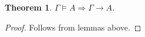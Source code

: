 \documentclass[a4paper]{article}
\theoremstyle{defin}
\newtheorem{defin}{Definition}
\theoremstyle{theorem}
\newtheorem{theorem}{Theorem}
\theoremstyle{prop}
\theoremstyle{lemma}
\theoremstyle{ex}
\theoremstyle{col}
\begin{document}
\begin{theorem}
  $\Gamma \models A \Rightarrow \Gamma \rightarrow A$.
\end{theorem}

\begin{proof}
  Follows from lemmas above.
\end{proof}

\begin{comment}

\begin{defin} Monoidal comonad
  $ $

  A monoidal comonad on some monoidal category $\mathcal{C}$ is a triple $\langle \mathcal{F}, \epsilon, \delta \rangle$,
  where $\mathcal{F}$ is a monoidal endofunctor and $\epsilon : \mathcal{F} \Rightarrow Id_{\mathcal{C}}$ (counit) and $\epsilon : \mathcal{F} \Rightarrow \mathcal{F}^2$ (comultiplication),
  such that the following diagrams commute:

\begin{minipage}{0.45\textwidth}
\begin{small}
\xymatrix{
\mathcal{F}A \otimes \mathcal{F}B \ar[dd]_{\delta_A \otimes \delta_B} \ar[r]^{\phi_{A,B}} & \mathcal{F}(A \otimes B) \ar[dr]^{\delta_{A \otimes B}} \\
&& \mathcal{F}\mathcal{F}(A \otimes B) \\
\mathcal{F}\mathcal{F}A \otimes \mathcal{F}\mathcal{F}B \ar[r]_{\phi_{\mathcal{F}A, \mathcal{F}B}} & \mathcal{F}(\mathcal{F}A \otimes \mathcal{F}B) \ar[ur]_{\mathcal{F}(\phi_{A,B})}
}
\end{small}
\end{minipage}%
\hfill
\begin{minipage}{0.5\textwidth}
\begin{tabular}{p{\textwidth}}
\xymatrix{
\mathcal{F}A \otimes \mathcal{F}B \ar[rr]^{\phi_{A,B}} \ar[dr]_{\epsilon_A \otimes \epsilon_B} && \mathcal{F}(A \otimes B) \ar[dl]^{\epsilon_{A \otimes B}} \\
& A \otimes B &
}
\end{tabular}
\end{minipage}%

\xymatrix{
&&&&&&& \mathds{1} \ar[r]^{\phi} \ar[d]_{\phi} & \mathcal{F}\mathds{1} \ar[d]^{\delta_{\mathds{1}}} \\
&&&&&&& \mathcal{F}\mathds{1} \ar[r]_{\mathcal{F}(\phi)} & \mathcal{F}\mathcal{F}\mathds{1}
}

\xymatrix{
&&&&&&& \mathds{1} \ar[dr]_{\phi} \ar[rr]^{id_{\mathds{1}}} && \mathds{1}\\
&&&&&&&& \mathcal{F}\mathds{1} \ar[ur]_{\epsilon_{\mathds{1}}} &
}
\end{defin}


\end{comment}
\end{document}
